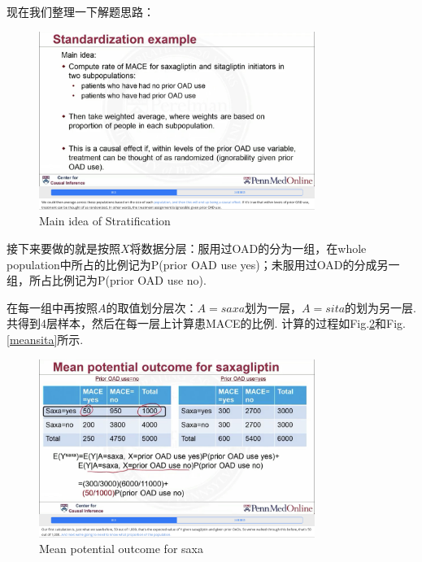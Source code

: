 现在我们整理一下解题思路：\\
\begin{figure}[htbp]
	\setlength{\abovecaptionskip}{0pt}     %
	\setlength{\belowcaptionskip}{10pt}
	\vspace{-0cm}  %
	\setlength{\abovecaptionskip}{-0cm}   %
	\setlength{\belowcaptionskip}{-0cm}   %
	\centering
	\includegraphics[width=0.8\textwidth]{figure/strtidea.jpg}
	\caption{Main idea of Stratification}
	\label{strtidea}
\end{figure}

接下来要做的就是按照$X$将数据分层：服用过OAD的分为一组，在whole population中所占的比例记为P(prior OAD use yes)；未服用过OAD的分成另一组，所占比例记为P(prior OAD use no). 

在每一组中再按照$A$的取值划分层次：$A=saxa$划为一层，$A=sita$的划为另一层. 共得到4层样本，然后在每一层上计算患MACE的比例. 计算的过程如Fig.\ref{meansaxa}和Fig.\ref{meansita}所示.
    \begin{figure}[htbp]
	\vspace{-0cm}  %
	\setlength{\abovecaptionskip}{0pt}   %
	\setlength{\belowcaptionskip}{2pt}   %
	   \centering                                \includegraphics[width=0.8\textwidth]{figure/meansaxa.jpg}
	   \caption{Mean potential outcome for saxa}   
       \label{meansaxa}
       \end{figure}

